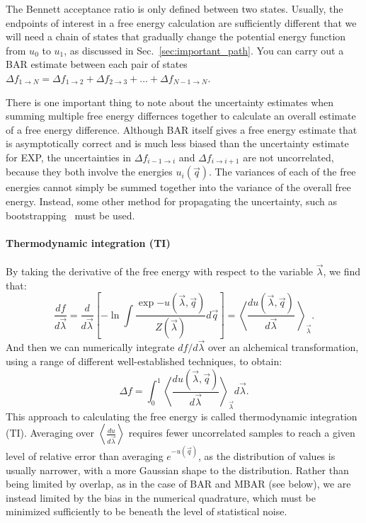 \documentclass[9pt,bestpractices]{livecoms}
\newcommand{\expect}[1]{\left\langle{#1}\right\rangle}
\begin{document}
The Bennett acceptance ratio is only defined between two states. Usually, the endpoints of interest in a free energy calculation are sufficiently different that we will need a chain of states that gradually change the potential energy function from $u_0$ to $u_1$, as discussed in Sec.~\ref{sec:important_path}. You can carry out a BAR estimate between each pair of states $\Delta f_{1 \rightarrow N} = \Delta {f_{1\rightarrow 2}} + \Delta {f_{2\rightarrow 3}} +  \ldots + \Delta f_{N-1\rightarrow N}$.

There is one important thing to note about the uncertainty estimates when summing multiple free energy differnces together to calculate an overall estimate of a free energy difference. Although BAR itself gives a free energy estimate that is asymptotically correct and is much less biased than the uncertainty estimate for EXP, the uncertainties in $\Delta {f_{i-1\rightarrow i}}$ and $\Delta {f_{i\rightarrow i+1}}$ are not uncorrelated, because they both involve the energies $u_i(\vec{q})$. The variances of each of the free energies cannot simply be summed together into the variance of the overall free energy. Instead, some other method for propagating the uncertainty, such as bootstrapping~\cite{grossfield2018best} must be used.

\paragraph{Thermodynamic integration (TI)}
By taking the derivative of the free energy with respect to the
variable $\vec{\lambda}$, we find that:
\begin{equation}
\frac{df}{d\vec{\lambda}} = \frac{d}{d\vec{\lambda}} \left[-\ln \int \frac{\exp{-u(\vec{\lambda},\vec{q})}}{Z(\vec{\lambda})} d\vec{q}\right] = \expect{\frac{du(\vec{\lambda},\vec{q})}{d\vec{\lambda}}\
}_{\vec{\lambda}} .
\end{equation}
And then we can numerically integrate $df/d\vec{\lambda}$ over an alchemical transformation, using a range of different well-established techniques, to obtain:
\begin{equation}
\Delta f    = \int_{0}^{1} \expect{\frac{du(\vec{\lambda},\vec{q})}{d\vec{\lambda}}}_{\vec{\lambda}}  d\vec{\lambda}.    
\end{equation}
This approach to calculating the free energy is called thermodynamic integration (TI). Averaging over $\expect{\frac{du}{d\vec{\lambda}}}$ requires fewer uncorrelated samples to reach a given level of relative error
than averaging $e^{-u(\vec{q})}$, as the distribution of values is usually narrower, with a more Gaussian shape to the distribution. Rather than being limited by overlap, as in the case of BAR and MBAR (see below), we are instead limited by the bias in the numerical quadrature, which must be minimized sufficiently to be beneath the level of statistical noise.
\end{document}
